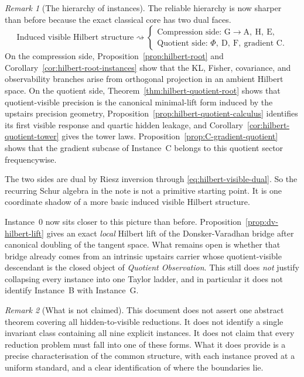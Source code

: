 \documentclass[11pt,a4paper]{article}
\numberwithin{equation}{section}
\theoremstyle{thmcompact}
\theoremstyle{remark}
\newtheorem*{remarkplain}{Remark}
\newenvironment{remark}[1][]%
{\begin{remarkbox}\begin{remarkplain}[#1]\normalfont}
		{\end{remarkplain}\end{remarkbox}}
\begin{document}
\begin{remark}[The hierarchy of instances]\label{rem:hierarchy}
The reliable hierarchy is now sharper than before because the exact classical core has two dual faces.
\[
\text{Induced visible Hilbert structure}
\rightsquigarrow
\begin{cases}
\text{Compression side: } \text{G} \to \text{A},\ \text{H},\ \text{E},\\[0.3em]
\text{Quotient side: } \Phi,\ \text{D},\ \text{F},\ \text{gradient C}.
\end{cases}
\]
On the compression side, Proposition~\ref{prop:hilbert-root} and Corollary~\ref{cor:hilbert-root-instances} show that the KL, Fisher, covariance, and observability branches arise from orthogonal projection in an ambient Hilbert space. On the quotient side, Theorem~\ref{thm:hilbert-quotient-root} shows that quotient-visible precision is the canonical minimal-lift form induced by the upstairs precision geometry, Proposition~\ref{prop:hilbert-quotient-calculus} identifies its first visible response and quartic hidden leakage, and Corollary~\ref{cor:hilbert-quotient-tower} gives the tower laws. Proposition~\ref{prop:C-gradient-quotient} shows that the gradient subcase of Instance~C belongs to this quotient sector frequencywise.

The two sides are dual by Riesz inversion through \eqref{eq:hilbert-visible-dual}. So the recurring Schur algebra in the note is not a primitive starting point. It is one coordinate shadow of a more basic induced visible Hilbert structure.

Instance~0 now sits closer to this picture than before. Proposition~\ref{prop:dv-hilbert-lift} gives an exact \emph{local} Hilbert lift of the Donsker-Varadhan bridge after canonical doubling of the tangent space. What remains open is whether that bridge already comes from an intrinsic upstairs carrier whose quotient-visible descendant is the closed object of \emph{Quotient Observation}. This still does \emph{not} justify collapsing every instance into one Taylor ladder, and in particular it does not identify Instance~B with Instance~G.
\end{remark}

\begin{remark}[What is not claimed]\label{rem:not-claimed}
This document does not assert one abstract theorem covering all hidden-to-visible reductions. It does not identify a single invariant class containing all nine explicit instances. It does not claim that every reduction problem must fall into one of these forms. What it does provide is a precise characterisation of the common structure, with each instance proved at a uniform standard, and a clear identification of where the boundaries lie.
\end{remark}
\end{document}
